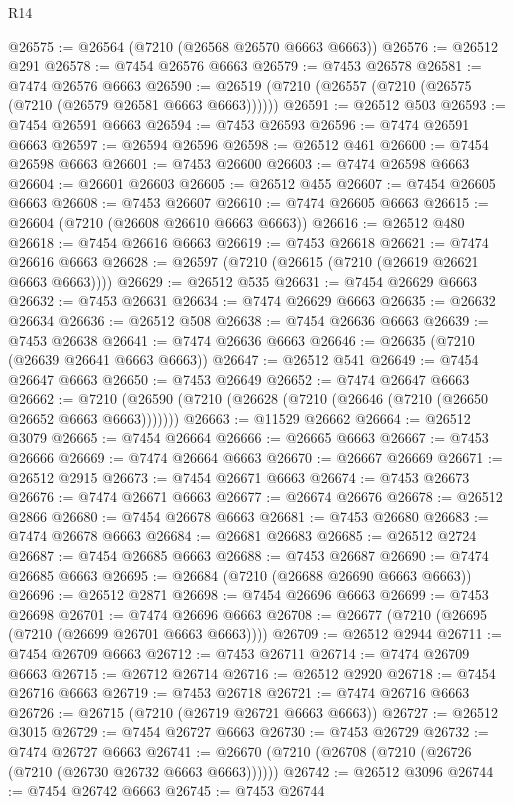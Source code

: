 \begin{lexlean}{R14}
\begin{coremodule}
@26575 := @26564 (@7210 (@26568 @26570 @6663 @6663))
@26576 := @26512 @291
@26578 := @7454 @26576 @6663
@26579 := @7453 @26578
@26581 := @7474 @26576 @6663
@26590 := @26519 (@7210 (@26557 (@7210 (@26575 (@7210 (@26579 @26581 @6663 @6663))))))
@26591 := @26512 @503
@26593 := @7454 @26591 @6663
@26594 := @7453 @26593
@26596 := @7474 @26591 @6663
@26597 := @26594 @26596
@26598 := @26512 @461
@26600 := @7454 @26598 @6663
@26601 := @7453 @26600
@26603 := @7474 @26598 @6663
@26604 := @26601 @26603
@26605 := @26512 @455
@26607 := @7454 @26605 @6663
@26608 := @7453 @26607
@26610 := @7474 @26605 @6663
@26615 := @26604 (@7210 (@26608 @26610 @6663 @6663))
@26616 := @26512 @480
@26618 := @7454 @26616 @6663
@26619 := @7453 @26618
@26621 := @7474 @26616 @6663
@26628 := @26597 (@7210 (@26615 (@7210 (@26619 @26621 @6663 @6663))))
@26629 := @26512 @535
@26631 := @7454 @26629 @6663
@26632 := @7453 @26631
@26634 := @7474 @26629 @6663
@26635 := @26632 @26634
@26636 := @26512 @508
@26638 := @7454 @26636 @6663
@26639 := @7453 @26638
@26641 := @7474 @26636 @6663
@26646 := @26635 (@7210 (@26639 @26641 @6663 @6663))
@26647 := @26512 @541
@26649 := @7454 @26647 @6663
@26650 := @7453 @26649
@26652 := @7474 @26647 @6663
@26662 := @7210 (@26590 (@7210 (@26628 (@7210 (@26646 (@7210 (@26650 @26652 @6663 @6663)))))))
@26663 := @11529 @26662
@26664 := @26512 @3079
@26665 := @7454 @26664
@26666 := @26665 @6663
@26667 := @7453 @26666
@26669 := @7474 @26664 @6663
@26670 := @26667 @26669
@26671 := @26512 @2915
@26673 := @7454 @26671 @6663
@26674 := @7453 @26673
@26676 := @7474 @26671 @6663
@26677 := @26674 @26676
@26678 := @26512 @2866
@26680 := @7454 @26678 @6663
@26681 := @7453 @26680
@26683 := @7474 @26678 @6663
@26684 := @26681 @26683
@26685 := @26512 @2724
@26687 := @7454 @26685 @6663
@26688 := @7453 @26687
@26690 := @7474 @26685 @6663
@26695 := @26684 (@7210 (@26688 @26690 @6663 @6663))
@26696 := @26512 @2871
@26698 := @7454 @26696 @6663
@26699 := @7453 @26698
@26701 := @7474 @26696 @6663
@26708 := @26677 (@7210 (@26695 (@7210 (@26699 @26701 @6663 @6663))))
@26709 := @26512 @2944
@26711 := @7454 @26709 @6663
@26712 := @7453 @26711
@26714 := @7474 @26709 @6663
@26715 := @26712 @26714
@26716 := @26512 @2920
@26718 := @7454 @26716 @6663
@26719 := @7453 @26718
@26721 := @7474 @26716 @6663
@26726 := @26715 (@7210 (@26719 @26721 @6663 @6663))
@26727 := @26512 @3015
@26729 := @7454 @26727 @6663
@26730 := @7453 @26729
@26732 := @7474 @26727 @6663
@26741 := @26670 (@7210 (@26708 (@7210 (@26726 (@7210 (@26730 @26732 @6663 @6663))))))
@26742 := @26512 @3096
@26744 := @7454 @26742 @6663
@26745 := @7453 @26744

\end{coremodule}
\end{lexlean}
